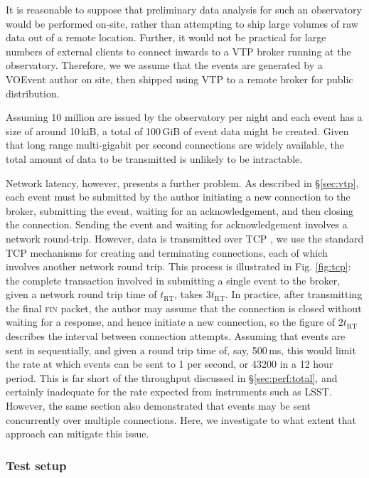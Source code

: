 \documentclass[5p,authoryear]{elsarticle}
\begin{document}
It is reasonable to suppose that preliminary data analysis for such an
observatory would be performed on-site, rather than attempting to ship large
volumes of raw data out of a remote location. Further, it would not be
practical for large numbers of external clients to connect inwards to a
VTP broker running at the observatory. Therefore, we we assume that the events
are generated by a VOEvent author on site, then shipped using VTP to a remote
broker for public distribution.

Assuming 10 million are issued by the observatory per night and each event
has a size of around 10\,kiB, a total of 100\,GiB of event data might be
created. Given that long range multi-gigabit per second connections are widely
available, the total amount of data to be transmitted is unlikely to be
intractable.

Network latency, however, presents a further problem. As described in
\S\ref{sec:vtp}, each event must be submitted by the author initiating a new
connection to the broker, submitting the event, waiting for an
acknowledgement, and then closing the connection. Sending the event and
waiting for acknowledgement involves a network round-trip.  However, data is
transmitted over TCP \citep{Cerf:1974}, we use the standard TCP mechanisms for
creating and terminating connections, each of which involves another network
round trip. This process is illustrated in Fig. \ref{fig:tcp}: the complete
transaction involved in submitting a single event to the broker, given a
network round trip time of $t_\mathrm{RT}$, takes $3 t_\mathrm{RT}$. In
practice, after transmitting the final \textsc{fin} packet, the author may
assume that the connection is closed without waiting for a response, and hence
initiate a new connection, so the figure of $2 t_\mathrm{RT}$ describes the
interval between connection attempts.  Assuming that events are sent in
sequentially, and given a round trip time of, say, 500\,ms, this would limit
the rate at which events can be sent to 1 per second, or 43200 in a 12 hour
period. This is far short of the throughput discussed in
\S\ref{sec:perf:total}, and certainly inadequate for the rate expected from
instruments such as LSST.  However, the same section also demonstrated that
events may be sent concurrently over multiple connections. Here, we
investigate to what extent that approach can mitigate this issue.

\subsubsection{Test setup}
\end{document}
